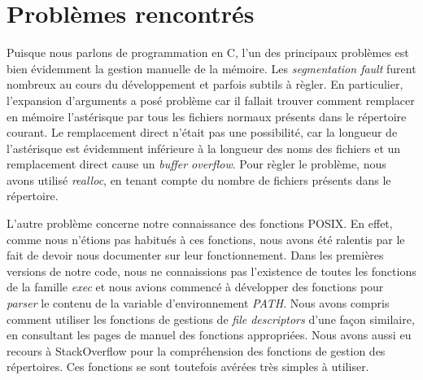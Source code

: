 \documentclass[letterpaper,12pt]{scrartcl}
\begin{document}
	\section{Problèmes rencontrés}
		Puisque nous parlons de programmation en C, l'un des principaux problèmes est bien évidemment la gestion manuelle de la mémoire. Les \textit{segmentation fault} furent nombreux au cours du développement et parfois subtils à règler. En particulier, l'expansion d'arguments a posé problème car il fallait trouver comment remplacer en mémoire l'astérisque par tous les fichiers normaux présents dans le répertoire courant. Le remplacement direct n'était pas une possibilité, car la longueur de l'astérisque est évidemment inférieure à la longueur des noms des fichiers et un remplacement direct cause un \textit{buffer overflow}. Pour règler le problème, nous avons utilisé \textit{realloc}, en tenant compte du nombre de fichiers présents dans le répertoire. 

		L'autre problème concerne notre connaissance des fonctions POSIX. En effet, comme nous n'étions pas habitués à ces fonctions, nous avons été ralentis par le fait de devoir nous documenter sur leur fonctionnement. Dans les premières versions de notre code, nous ne connaissions pas l'existence de toutes les fonctions de la famille \textit{exec} et nous avions commencé à développer des fonctions pour \textit{parser} le contenu de la variable d'environnement \textit{PATH}. Nous avons compris comment utiliser les fonctions de gestions de \textit{file descriptors} d'une façon similaire, en consultant les pages de manuel des fonctions appropriées. Nous avons aussi eu recours à StackOverflow pour la compréhension des fonctions de gestion des répertoires. Ces fonctions se sont toutefois avérées très simples à utiliser.
\end{document}
